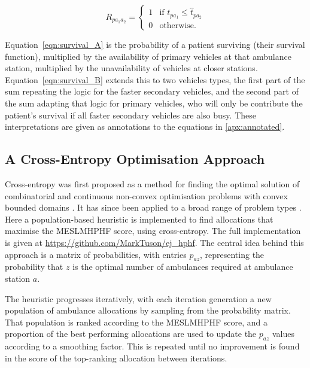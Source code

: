\documentclass[preprint,12pt]{elsarticle}
\begin{document}
\begin{equation}\label{eqn:R} R_{p a_1 a_2} = \begin{cases} 1 & \text{if } t_{p
a_1} \leq \hat{t}_{p a_2}\\ 0 & \text{otherwise.} \end{cases} \end{equation}

Equation~\ref{eqn:survival_A} is the probability of a patient surviving (their
survival function), multiplied by the availability of primary vehicles at that
ambulance station, multiplied by the unavailability of vehicles at closer
stations.  Equation~\ref{eqn:survival_B} extends this to two vehicles types, the
first part of the sum repeating the logic for the faster secondary vehicles, and
the second part of the sum adapting that logic for primary vehicles, who will
only be contribute the patient's survival if all faster secondary vehicles are
also busy. These interpretations are given as annotations to the equations in
\ref{apx:annotated}.

\subsection{A Cross-Entropy Optimisation Approach}\label{sec:cross_entropy}
Cross-entropy was first proposed as a method for finding the optimal solution of
combinatorial and continuous non-convex optimisation problems with convex
bounded domains \cite{RubinsteinReuven1999TCMf}. It has since been applied to a
broad range of problem types \cite{deBoerPieter-Tjerk2005ATot}. Here a
population-based heuristic is implemented to find allocations that maximise the
MESLMHPHF score, using cross-entropy. The full implementation is given at
\url{https://github.com/MarkTuson/ej_hphf}. The central idea behind this
approach is a matrix of probabilities, with entries $p_{az}$, representing the
probability that $z$ is the optimal number of ambulances required at ambulance
station $a$.

The heuristic progresses iteratively, with each iteration generation a new
population of ambulance allocations by sampling from the probability matrix.
That population is ranked according to the MESLMHPHF score, and a proportion of
the best performing allocations are used to update the $p_{az}$ values according
to a smoothing factor. This is repeated until no improvement is found in the
score of the top-ranking allocation between iterations.
\end{document}
